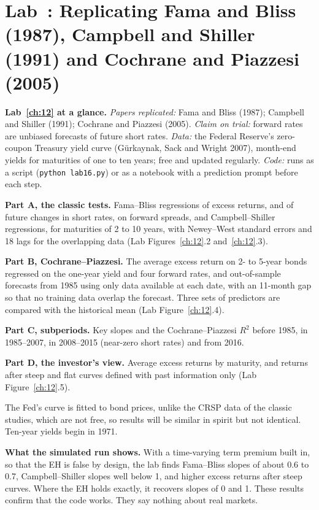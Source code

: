 \section{Lab~\thechapter: Replicating Fama and Bliss (1987), Campbell and Shiller (1991) and Cochrane and Piazzesi (2005)}
\label{sec:07-lab}

\begin{callout}
\textbf{Lab~\ref{ch:12} at a glance.} \emph{Papers replicated:} Fama and Bliss (1987); Campbell and Shiller (1991); Cochrane and Piazzesi (2005). \emph{Claim on trial:} forward rates are unbiased forecasts of future short rates. \emph{Data:} the Federal Reserve's zero-coupon Treasury yield curve (G\"urkaynak, Sack and Wright 2007), month-end yields for maturities of one to ten years; free and updated regularly. \emph{Code:} runs as a script (\texttt{python lab16.py}) or as a notebook with a prediction prompt before each step.
\end{callout}

\textbf{Part A, the classic tests.} Fama--Bliss regressions of excess returns, and of future changes in short rates, on forward spreads, and Campbell--Shiller regressions, for maturities of 2 to 10 years, with Newey--West standard errors and 18 lags for the overlapping data (Lab Figures~\ref{ch:12}.2 and~\ref{ch:12}.3).

\textbf{Part B, Cochrane--Piazzesi.} The average excess return on 2- to 5-year bonds regressed on the one-year yield and four forward rates, and out-of-sample forecasts from 1985 using only data available at each date, with an 11-month gap so that no training data overlap the forecast. Three sets of predictors are compared with the historical mean (Lab Figure~\ref{ch:12}.4).

\textbf{Part C, subperiods.} Key slopes and the Cochrane--Piazzesi $R^2$ before 1985, in 1985--2007, in 2008--2015 (near-zero short rates) and from 2016.

\textbf{Part D, the investor's view.} Average excess returns by maturity, and returns after steep and flat curves defined with past information only (Lab Figure~\ref{ch:12}.5).

The Fed's curve is fitted to bond prices, unlike the CRSP data of the classic studies, which are not free, so results will be similar in spirit but not identical. Ten-year yields begin in 1971.

\textbf{What the simulated run shows.} With a time-varying term premium built in, so that the EH is false by design, the lab finds Fama--Bliss slopes of about 0.6 to 0.7, Campbell--Shiller slopes well below 1, and higher excess returns after steep curves. Where the EH holds exactly, it recovers slopes of 0 and 1. These results confirm that the code works. They say nothing about real markets.


